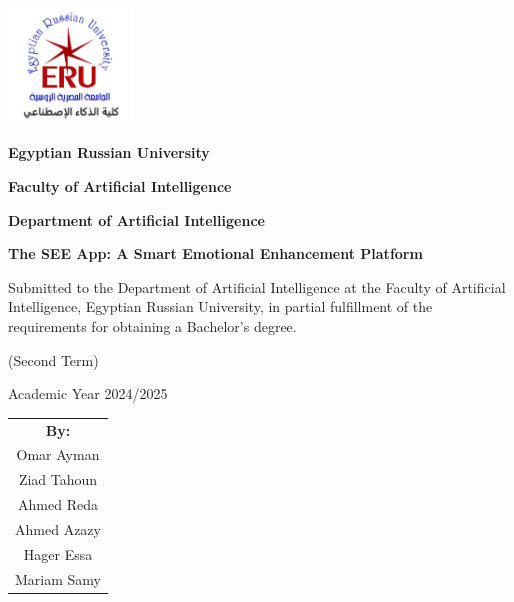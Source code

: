 \documentclass[12pt,a4paper]{article}
\author{Omar Ayman, Ziad Tahoun, Ahmed Reda, Ahmed Azazy, Hager Essa, Mariam Samy}
\date{Academic Year 2024/2025}
\begin{document}
\begin{titlepage}
    \centering
    \vspace*{-2cm}

    \includegraphics[width=0.25\textwidth]{logo/erulogo.jpg}\par
    \vspace{0.3cm}
    {\large \textbf{Egyptian Russian University}}\par
    {\LARGE {}}\par
    \vspace{0.1cm}
    {\large \textbf{Faculty of Artificial Intelligence}}\par
    \vspace{0.1cm}
    {\large \textbf{Department of Artificial Intelligence}}\par
    \vspace{0.5cm}

    {\huge \textbf{The SEE App: A Smart Emotional Enhancement Platform}}\par
    \vspace{0.2cm}
    {\LARGE {}}\par
    {\LARGE {}}\par
    \vspace{0.6cm}

    {\small Submitted to the Department of Artificial Intelligence at the Faculty of Artificial Intelligence, Egyptian Russian University, in partial fulfillment of the requirements for obtaining a Bachelor's degree.}\par
    \vspace{0.4cm}
    {\normalsize (Second Term)}\par
    {\normalsize Academic Year 2024/2025}\par
    \vspace{0.6cm}

    \begin{tabular}{c}
        \textbf{By:} \\
        Omar Ayman \\
        Ziad Tahoun \\
        Ahmed Reda \\
        Ahmed Azazy \\
        Hager Essa \\
        Mariam Samy \\
    \end{tabular}\par
    \vspace{0.3cm}


\end{titlepage}
\end{document}
